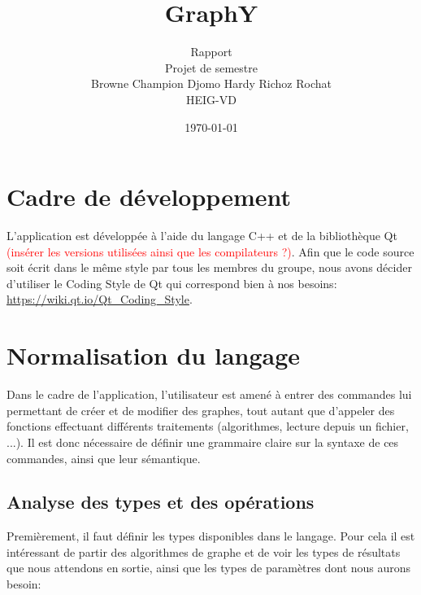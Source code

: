 \documentclass[french]{article}
\begin{document}
	\title{GraphY} %
	\author{Rapport\\ 
		Projet de semestre\\
		Browne Champion Djomo Hardy Richoz Rochat\\
		HEIG-VD}
	\date{\today} %
	\maketitle
	
	\tableofcontents
	
	\listoffigures
	
	\justify
	\normalsize
	
	\section{Cadre de développement} %
		L'application est développée à l'aide du langage C++ et de la bibliothèque Qt \textcolor{red}{(insérer les versions utilisées ainsi que les compilateurs ?)}. Afin que le code source soit écrit dans le même style par tous les membres du groupe, nous avons décider d'utiliser le Coding Style de Qt qui correspond bien à nos besoins: \url{https://wiki.qt.io/Qt_Coding_Style}.
	
	\section{Normalisation du langage} %
		Dans le cadre de l'application, l'utilisateur est amené à entrer des commandes lui permettant de créer et de modifier des graphes, tout autant que d'appeler des fonctions effectuant différents traitements (algorithmes, lecture depuis un fichier, ...). Il est donc nécessaire de définir une grammaire claire sur la syntaxe de ces commandes, ainsi que leur sémantique.
			
		\subsection{Analyse des types et des opérations} %
			Premièrement, il faut définir les types disponibles dans le langage. Pour cela il est intéressant de partir des algorithmes de graphe et de voir les types de résultats que nous attendons en sortie, ainsi que les types de paramètres dont nous aurons besoin:
				
\end{document}
